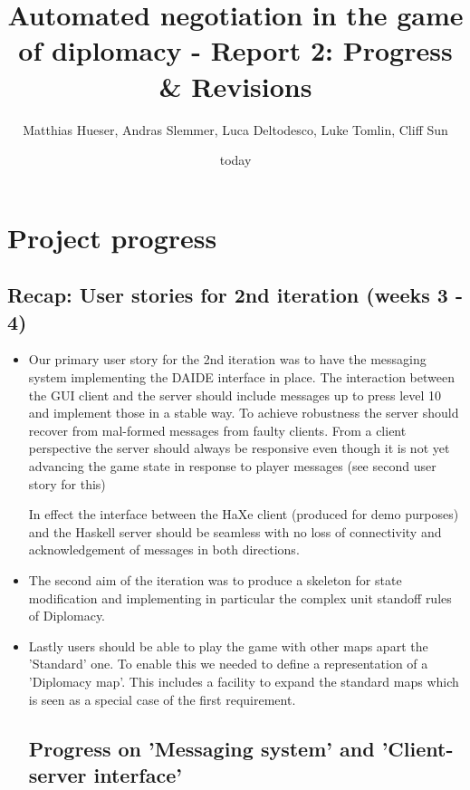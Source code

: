 \documentclass[12pt]{article}
\title{Automated negotiation in the game of diplomacy - Report 2: Progress \& Revisions}
\author{Matthias Hueser, Andras Slemmer, Luca Deltodesco, Luke Tomlin, Cliff Sun}
\date{today}
\begin{document}
\maketitle

\section{Project progress}

\subsection{Recap: User stories for 2nd iteration (weeks 3 - 4)}

\begin{itemize}

\item Our primary user story for the 2nd iteration was to have the messaging system
implementing the DAIDE interface in place. The interaction between
the GUI client and the server should include messages up to press level
10 and implement those in a stable way. To achieve robustness the server should
recover from mal-formed messages from faulty clients. From a client perspective
the server should always be responsive even though it is not yet advancing the game state in
response to player messages (see second user story for this)

In effect the interface between the HaXe client (produced for demo purposes)
and the Haskell server should be seamless with no loss of connectivity and 
acknowledgement of messages in both directions.

\item The second aim of the iteration was to produce a skeleton for state modification
and implementing in particular the complex unit standoff rules of Diplomacy.

\item Lastly users should be able to play the game with other maps apart the 'Standard' one.
To enable this we needed to define a representation of a 'Diplomacy map'. This includes
a facility to expand the standard maps which is seen as a special case of the
first requirement.

\subsection{Progress on 'Messaging system' and 'Client-server interface'}

\begin{itemize}


\end{itemize}
\end{itemize}
\end{document}
